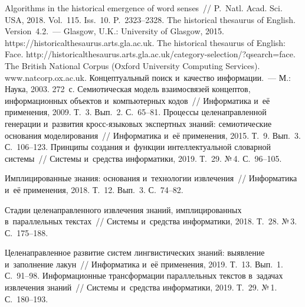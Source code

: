 \begin{multicols}{2}
{{\begin{thebibliography}{99}
 Algorithms in the historical emergence of 
word senses~// P.~Natl. Acad. Sci. USA, 2018. Vol.~115. Iss.~10. 
P.~2323--2328.
 The historical thesaurus of 
English. Version~4.2.~--- Glasgow, U.K.: University of Glasgow, 2015. {\sf 
https://historicalthesaurus.arts.gla.ac.uk}.
 The historical thesaurus of 
English: Face. {\sf http://historicalthesaurus.arts.gla.ac.uk/category-selection/?qsearch=face}.
The British National Corpus (Oxford University Computing Services). {\sf www.natcorp.ox.ac.uk}.
 Концептуальный поиск и~качество информации.~--- М.: Наука, 2003. 
272~с.
 Семиотическая модель взаимосвязей концептов, информационных 
объектов и~компьютерных кодов~// Информатика и~её применения, 2009. Т.~3. Вып.~2.  
С.~65--81.
 Процессы целенаправленной генерации и~развития кросс-язы\-ко\-вых 
экспертных знаний: семиотические основания моделирования~// Информатика и~её 
применения, 2015. Т.~9. Вып.~3. С.~106--123.
 Принципы создания и~функции интеллектуальной 
словарной системы~// Системы и~средства информатики, 2019. Т.~29. №\,4. С.~96--105.

 Имплицированные знания: основания и~технологии извлечения~// 
Информатика и~её применения, 2018. Т.~12. Вып.~3. С.~74--82.

 Стадии целенаправленного извлечения знаний, имплицированных 
в~параллельных текстах~// Системы и~средства информатики, 2018. Т.~28. №\,3.  
С.~175--188.

 Целенаправленное развитие систем лингвистических знаний: выявление и~заполнение лакун~// Информатика и~её применения, 2019. Т.~13. Вып.~1. С.~91--98.
 Информационные трансформации параллельных текстов 
в~задачах извлечения знаний~// Системы и~средства информатики, 2019. Т.~29. №\,1.  
С.~180--193.
 \end{thebibliography}

 }
 }

\end{multicols}

\vspace*{-6pt}

